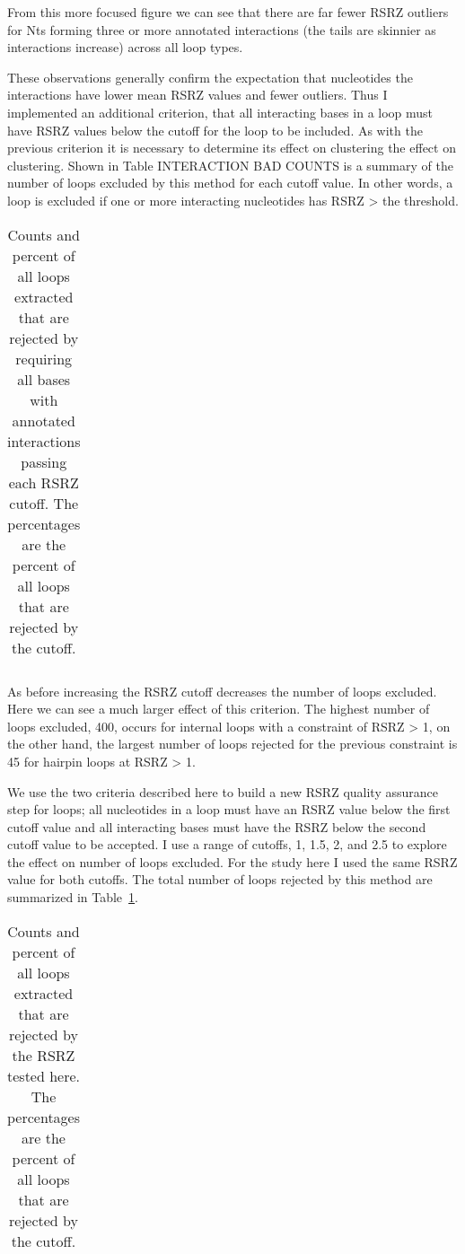 From this more focused figure we can see that there are far fewer RSRZ outliers
for Nts forming three or more annotated interactions (the tails are skinnier as
interactions increase) across all loop types. 

These observations generally confirm the expectation that nucleotides the
interactions have lower mean RSRZ values and fewer outliers. Thus I implemented
an additional criterion, that all interacting bases in a loop must have RSRZ
values below the cutoff for the loop to be included. As with the previous
criterion it is necessary to determine its effect on clustering the effect on
clustering. Shown in Table INTERACTION BAD COUNTS is a summary of the number of
loops excluded by this method for each cutoff value. In other words, a loop is
excluded if one or more interacting nucleotides has RSRZ > the threshold.

\begin{table}
  \begin{tabular}{lr}
    \toprule
    \midrule
    \bottomrule
  \end{tabular}
  \caption{Counts and percent of all loops extracted that are rejected by
    requiring all bases with annotated interactions passing each RSRZ cutoff.
    The percentages are the percent of all loops that are rejected by the
  cutoff.}
\end{table}

As before increasing the RSRZ cutoff decreases the number of loops excluded.
Here we can see a much larger effect of this criterion. The highest number of
loops excluded, 400, occurs for internal loops with a constraint of RSRZ > 1, on
the other hand, the largest number of loops rejected for the previous constraint
is 45 for hairpin loops at RSRZ > 1. 

We use the two criteria described here to build a new RSRZ quality assurance
step for loops; all nucleotides in a loop must have an RSRZ value below the
first cutoff value and all interacting bases must have the RSRZ below the second
cutoff value to be accepted. I use a range of cutoffs, 1, 1.5, 2, and 2.5 to
explore the effect on number of loops excluded. For the study here I used the
same RSRZ value for both cutoffs. The total number of loops rejected by this
method are summarized in Table~\ref{tab:rsrz-reject-summary}.

\begin{table}
  \begin{tabular}{lr}
    \toprule
    \midrule
    \bottomrule
  \end{tabular}
  \caption{Counts and percent of all loops extracted that are rejected by the
    RSRZ tested here. The percentages are the percent of all loops that are
  rejected by the cutoff.}
  \label{tab:rsrz-reject-summary}
\end{table}

